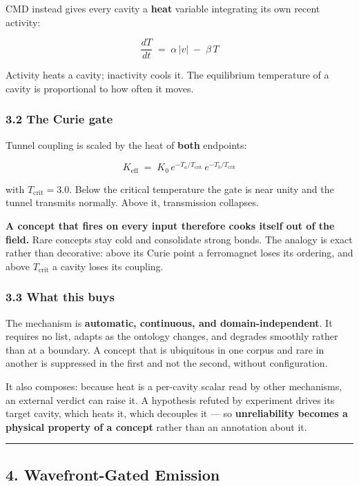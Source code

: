 \documentclass[
  11pt,
  a4paper,
]{article}
\begin{document}
CMD instead gives every cavity a \textbf{heat} variable integrating its
own recent activity:

\[
\frac{dT}{dt} \;=\; \alpha\,|v| \;-\; \beta\,T
\]

Activity heats a cavity; inactivity cools it. The equilibrium
temperature of a cavity is proportional to how often it moves.

\subsubsection{3.2 The Curie gate}\label{the-curie-gate}

Tunnel coupling is scaled by the heat of \textbf{both} endpoints:

\[
K_{\text{eff}} \;=\; K_0 \, e^{-T_a / T_{\text{crit}}}\, e^{-T_b / T_{\text{crit}}}
\]

with \(T_{\text{crit}} = 3.0\). Below the critical temperature the gate
is near unity and the tunnel transmits normally. Above it, transmission
collapses.

\textbf{A concept that fires on every input therefore cooks itself out
of the field.} Rare concepts stay cold and consolidate strong bonds. The
analogy is exact rather than decorative: above its Curie point a
ferromagnet loses its ordering, and above \(T_{\text{crit}}\) a cavity
loses its coupling.

\subsubsection{3.3 What this buys}\label{what-this-buys}

The mechanism is \textbf{automatic, continuous, and domain-independent}.
It requires no list, adapts as the ontology changes, and degrades
smoothly rather than at a boundary. A concept that is ubiquitous in one
corpus and rare in another is suppressed in the first and not the
second, without configuration.

It also composes: because heat is a per-cavity scalar read by other
mechanisms, an external verdict can raise it. A hypothesis refuted by
experiment drives its target cavity, which heats it, which decouples it
--- so \textbf{unreliability becomes a physical property of a concept}
rather than an annotation about it.

\begin{center}\rule{0.5\linewidth}{0.5pt}\end{center}

\subsection{4. Wavefront-Gated Emission}\label{wavefront-gated-emission}
\end{document}
